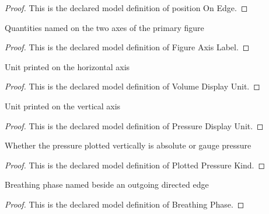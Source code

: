 \begin{proof}
  This is the declared model definition of position On Edge.
\end{proof}
\begin{definition}
  \label{def:physics:phyx-mini-0336:phyxminiproblems-problemphyxmini0336-figureaxislabel}
  Quantities named on the two axes of the primary figure
\end{definition}
\begin{proof}
  This is the declared model definition of Figure Axis Label.
\end{proof}
\begin{definition}
  \label{def:physics:phyx-mini-0336:phyxminiproblems-problemphyxmini0336-volumedisplayunit}
  Unit printed on the horizontal axis
\end{definition}
\begin{proof}
  This is the declared model definition of Volume Display Unit.
\end{proof}
\begin{definition}
  \label{def:physics:phyx-mini-0336:phyxminiproblems-problemphyxmini0336-pressuredisplayunit}
  Unit printed on the vertical axis
\end{definition}
\begin{proof}
  This is the declared model definition of Pressure Display Unit.
\end{proof}
\begin{definition}
  \label{def:physics:phyx-mini-0336:phyxminiproblems-problemphyxmini0336-plottedpressurekind}
  Whether the pressure plotted vertically is absolute or gauge pressure
\end{definition}
\begin{proof}
  This is the declared model definition of Plotted Pressure Kind.
\end{proof}
\begin{definition}
  \label{def:physics:phyx-mini-0336:phyxminiproblems-problemphyxmini0336-breathingphase}
  Breathing phase named beside an outgoing directed edge
\end{definition}
\begin{proof}
  This is the declared model definition of Breathing Phase.
\end{proof}
